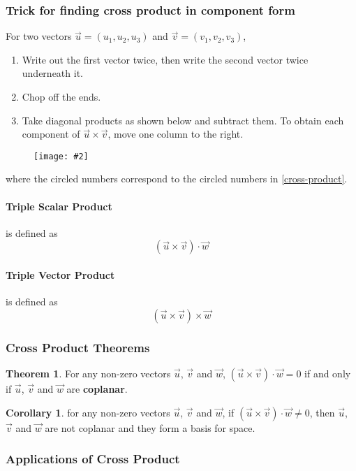 \documentclass[letterpaper, 12pt]{report}
\newcommand{\diagram}[2][0.5]{
	\begin{figure}[H]
		\centering
		\texttt{[image: \#2]}
	\end{figure}
	}
\theoremstyle{definition}
\newtheorem{thm}{Theorem}[section]
\newtheorem{cor}{Corollary}[thm]
\numberwithin{equation}{section}
\begin{document}
\subsubsection*{Trick for finding cross product in component form}
For two vectors $\vec u = (u_1,u_2,u_3)$ and $\vec v = (v_1,v_2,v_3)$,
\begin{enumerate}
	\item Write out the first vector twice, then write the second vector twice underneath it.
	\item Chop off the ends.
	\item Take diagonal products as shown below and subtract them. To obtain each component of $\vec u \times \vec v$, move one column to the right.
\end{enumerate}
\diagram[0.7]{cross-product}
where the circled numbers correspond to the circled numbers in \eqref{cross-product}.

\paragraph{Triple Scalar Product} is defined as
\begin{equation}
	( \vec u \times \vec v ) \cdot \vec w
\end{equation}

\paragraph{Triple Vector Product} is defined as
\begin{equation}
	( \vec u \times \vec v ) \times \vec w
\end{equation}

\subsubsection{Cross Product Theorems}
\begin{thm}
	For any non-zero vectors $\vec u$, $\vec v$ and $\vec w$, $(\vec u \times \vec v) \cdot \vec w = 0$ if and only if $\vec u$, $\vec v$ and $\vec w$ are \textbf{coplanar}.
\end{thm}
\begin{cor}
	for any non-zero vectors $\vec u$, $\vec v$ and $\vec w$, if $(\vec u \times \vec v) \cdot \vec w \ne 0$, then $\vec u$, $\vec v$ and $\vec w$ are not coplanar and they form a basis for space.
\end{cor}

\subsubsection{Applications of Cross Product}
\end{document}

